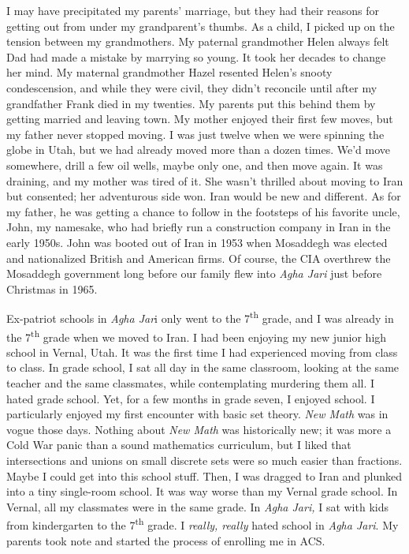 I may have precipitated my parents' marriage, but they had their reasons
for getting out from under my grandparent's thumbs. As a child, I picked
up on the tension between my grandmothers. My paternal grandmother Helen
always felt Dad had made a mistake by marrying so young. It took her
decades to change her mind. My maternal grandmother Hazel resented
Helen's snooty condescension, and while they were civil, they didn't
reconcile until after my grandfather Frank died in my twenties. My
parents put this behind them by getting married and leaving town. My
mother enjoyed their first few moves, but my father never stopped
moving. I was just twelve when we were spinning the globe in Utah, but
we had already moved more than a dozen times. We'd move somewhere, drill
a few oil wells, maybe only one, and then move again. It was draining,
and my mother was tired of it. She wasn't thrilled about moving to Iran
but consented; her adventurous side won. Iran would be new and
different. As for my father, he was getting a chance to follow in the
footsteps of his favorite uncle, John, my namesake, who had briefly run
a construction company in Iran in the early 1950s. John was booted out
of Iran in 1953 when Mosaddegh was elected and nationalized British and
American firms. Of course, the CIA overthrew the Mosaddegh government
long before our family flew into \emph{Agha Jari} just before Christmas
in 1965.

Ex-patriot schools in \emph{Agha Jar}i only went to the
7\textsuperscript{th} grade, and I was already in the
7\textsuperscript{th} grade when we moved to Iran. I had been enjoying
my new junior high school in Vernal, Utah. It was the first time I had
experienced moving from class to class. In grade school, I sat all day
in the same classroom, looking at the same teacher and the same
classmates, while contemplating murdering them all. I hated grade
school. Yet, for a few months in grade seven, I enjoyed school. I
particularly enjoyed my first encounter with basic set theory. \emph{New
Math} was in vogue those days. Nothing about \emph{New Math} was
historically new; it was more a Cold War panic than a sound mathematics
curriculum, but I liked that intersections and unions on small discrete
sets were so much easier than fractions. Maybe I could get into this
school stuff. Then, I was dragged to Iran and plunked into a tiny
single-room school. It was way worse than my Vernal grade school. In
Vernal, all my classmates were in the same grade. In \emph{Agha Jari,} I
sat with kids from kindergarten to the 7\textsuperscript{th} grade. I
\emph{really, really} hated school in \emph{Agha Jari}. My parents took
note and started the process of enrolling me in ACS.

